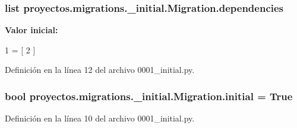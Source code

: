 \subsubsection[{\texorpdfstring{dependencies}{dependencies}}]{\setlength{\rightskip}{0pt plus 5cm}list proyectos.\+migrations.\+\_\+initial.\+Migration.\+dependencies\hspace{0.3cm}{\ttfamily [static]}}\hypertarget{classproyectos_1_1migrations_1_10001__initial_1_1_migration_aade2052158dfe1c7cd44262f342334c2}{}\label{classproyectos_1_1migrations_1_10001__initial_1_1_migration_aade2052158dfe1c7cd44262f342334c2}
{\bfseries Valor inicial\+:}
\begin{DoxyCode}
1 = [
2     ]
\end{DoxyCode}


Definición en la línea 12 del archivo 0001\+\_\+initial.\+py.

\subsubsection[{\texorpdfstring{initial}{initial}}]{\setlength{\rightskip}{0pt plus 5cm}bool proyectos.\+migrations.\+\_\+initial.\+Migration.\+initial = True\hspace{0.3cm}{\ttfamily [static]}}\hypertarget{classproyectos_1_1migrations_1_10001__initial_1_1_migration_a063694a5526c928b9cbe2a41e19e6536}{}\label{classproyectos_1_1migrations_1_10001__initial_1_1_migration_a063694a5526c928b9cbe2a41e19e6536}


Definición en la línea 10 del archivo 0001\+\_\+initial.\+py.


